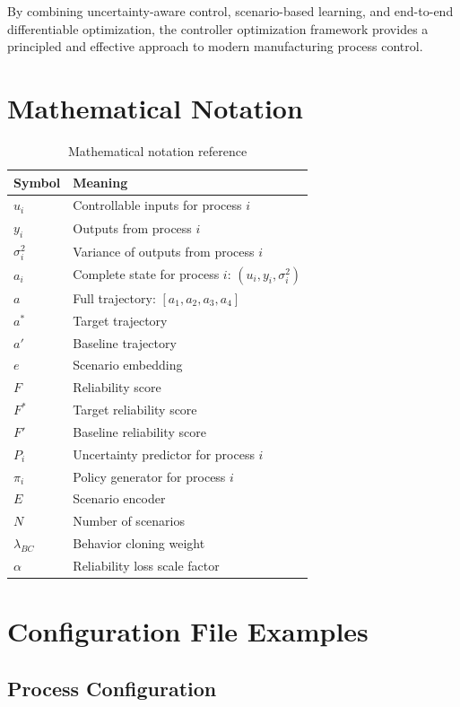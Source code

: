 \documentclass[11pt,a4paper]{article}
\begin{document}
By combining uncertainty-aware control, scenario-based learning, and end-to-end differentiable optimization, the controller optimization framework provides a principled and effective approach to modern manufacturing process control.

\appendix

\section{Mathematical Notation}

\begin{table}[h!]
\centering
\begin{tabular}{@{}ll@{}}
\toprule
\textbf{Symbol} & \textbf{Meaning} \\ \midrule
$u_i$ & Controllable inputs for process $i$ \\
$y_i$ & Outputs from process $i$ \\
$\sigma^2_i$ & Variance of outputs from process $i$ \\
$a_i$ & Complete state for process $i$: $(u_i, y_i, \sigma^2_i)$ \\
$a$ & Full trajectory: $[a_1, a_2, a_3, a_4]$ \\
$a^*$ & Target trajectory \\
$a'$ & Baseline trajectory \\
$e$ & Scenario embedding \\
$F$ & Reliability score \\
$F^*$ & Target reliability score \\
$F'$ & Baseline reliability score \\
$P_i$ & Uncertainty predictor for process $i$ \\
$\pi_i$ & Policy generator for process $i$ \\
$E$ & Scenario encoder \\
$N$ & Number of scenarios \\
$\lambda_{BC}$ & Behavior cloning weight \\
$\alpha$ & Reliability loss scale factor \\ \bottomrule
\end{tabular}
\caption{Mathematical notation reference}
\end{table}

\section{Configuration File Examples}

\subsection{Process Configuration}
\end{document}
